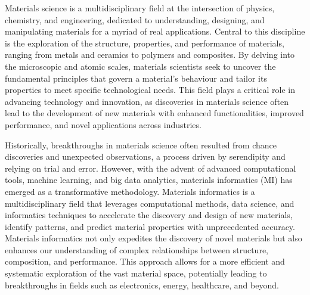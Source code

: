 

Materials science is a multidisciplinary field at the intersection of physics, chemistry, and engineering, dedicated to understanding, designing, and manipulating materials for a myriad of real applications. 
Central to this discipline is the exploration of the structure, properties, and performance of materials, ranging from metals and ceramics to polymers and composites. By delving into the microscopic and atomic scales, materials scientists seek to uncover the fundamental principles that govern a material's behaviour and tailor its properties to meet specific technological needs. 
This field plays a critical role in advancing technology and innovation, as discoveries in materials science often lead to the development of new materials with enhanced functionalities, improved performance, and novel applications across industries.

Historically, breakthroughs in materials science often resulted from chance discoveries and unexpected observations, a process driven by serendipity and relying on trial and error. 
However, with the advent of advanced computational tools, machine learning, and big data analytics, materials informatics (MI) has emerged as a transformative methodology. 
Materials informatics is a multidisciplinary field that leverages computational methods, data science, and informatics techniques to accelerate the discovery and design of new materials, identify patterns, and predict material properties with unprecedented accuracy. 
Materials informatics not only expedites the discovery of novel materials but also enhances our understanding of complex relationships between structure, composition, and performance. 
This approach allows for a more efficient and systematic exploration of the vast material space, potentially leading to breakthroughs in fields such as electronics, energy, healthcare, and beyond. 

